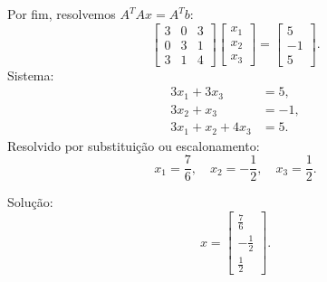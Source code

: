 \begin{resolution}
\begin{enumerate}[label=\alph*)]
          Por fim, resolvemos \( A^T A x = A^T b \):
          \[
            \begin{bmatrix}
              3 & 0 & 3 \\
              0 & 3 & 1 \\
              3 & 1 & 4
            \end{bmatrix}
            \begin{bmatrix}
              x_1 \\
              x_2 \\
              x_3
            \end{bmatrix} =
            \begin{bmatrix}
              5  \\
              -1 \\
              5
            \end{bmatrix}.
          \]
          Sistema:
          \[
            \begin{aligned}
              3x_1 + 3x_3       & = 5,  \\
              3x_2 + x_3        & = -1, \\
              3x_1 + x_2 + 4x_3 & = 5.
            \end{aligned}
          \]
          Resolvido por substituição ou escalonamento:
          \[
            x_1 = \frac{7}{6}, \quad x_2 = -\frac{1}{2}, \quad x_3 = \frac{1}{2}.
          \]

          Solução:
          \[
            x = \begin{bmatrix}
              \frac{7}{6}  \\[8pt]
              -\frac{1}{2} \\[8pt]
              \frac{1}{2}
            \end{bmatrix}.
          \]

  \end{enumerate}
\end{resolution}

